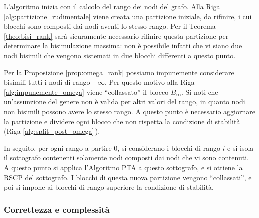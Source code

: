 L'algoritmo inizia con il calcolo del rango dei nodi del grafo. Alla Riga \ref{alg:partizione_rudimentale} viene creata una partizione iniziale, da rifinire, i cui blocchi sono composti dai nodi aventi lo stesso rango. Per il Teorema \ref{theo:bisi_rank} sarà sicuramente necessario rifinire questa partizione per determinare la bisimulazione massima: non è possibile infatti che vi siano due nodi bisimili che vengono sistemati in due blocchi differenti a questo punto.

Per la Proposizione \ref{prop:omega_rank} possiamo impunemente considerare bisimili tutti i nodi di rango $-\infty$. Per questo motivo alla Riga \ref{alg:impunemente_omega} viene ``collassato'' il blocco $B_\infty$. Si noti che un'assunzione del genere non è valida per altri valori del rango, in quanto nodi non bisimili possono avere lo stesso rango. A questo punto è necessario aggiornare la partizione e dividere ogni blocco che non rispetta la condizione di stabilità (Riga \ref{alg:split_post_omega}\,).

In seguito, per ogni rango a partire 0, si considerano i blocchi di rango $i$ e si isola il sottografo contenenti solamente nodi composti dai nodi che vi sono contenuti. A questo punto si applica l'Algoritmo PTA a questo sottografo, e si ottiene la RSCP del sottografo. I blocchi di questa nuova partizione vengono ``collassati'', e poi si impone ai blocchi di rango superiore la condizione di stabilità.

\subsubsection{Correttezza e complessità}
